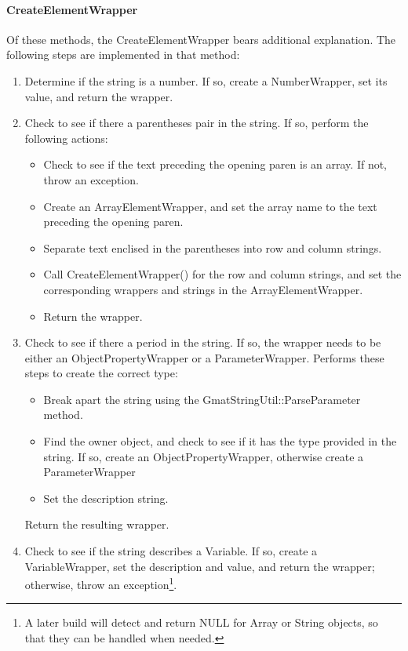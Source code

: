 \paragraph{CreateElementWrapper}  Of these methods, the CreateElementWrapper bears additional
explanation.  The following steps are implemented in that method:

\begin{enumerate}
\item Determine if the string is a number.  If so, create a NumberWrapper, set its value, and
return the wrapper.
\item Check to see if there a parentheses pair in the string.  If so, perform the following actions:
\begin{itemize}
\item Check to see if the text preceding the opening paren is an array.  If not, throw an exception.
\item Create an ArrayElementWrapper, and set the array name to the text preceding the opening paren.
\item Separate text enclised in the parentheses into row and column strings.
\item Call CreateElementWrapper() for the row and column strings, and set the corresponding
wrappers and strings in the ArrayElementWrapper.
\item Return the wrapper.
\end{itemize}
\item Check to see if there a period in the string.  If so, the wrapper needs to be either an
ObjectPropertyWrapper or a ParameterWrapper.  Performs these steps to create the correct type:
\begin{itemize}
\item Break apart the string using the GmatStringUtil::ParseParameter method.
\item Find the owner object, and check to see if it has the type provided in the string.  If so,
create an ObjectPropertyWrapper, otherwise create a ParameterWrapper
\item Set the description string.
\end{itemize}
Return the resulting wrapper.
\item Check to see if the string describes a Variable.  If so, create a VariableWrapper, set the
description and value, and return the wrapper; otherwise, throw an exception\footnote{A later build
will detect and return NULL for Array or String objects, so that they can be handled when needed.}.
\end{enumerate}

